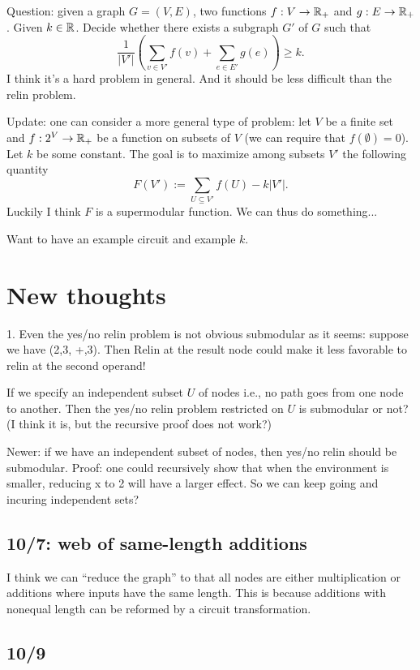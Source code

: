 \documentclass[11pt]{article} %
\theoremstyle{plain}
\theoremstyle{definition}
\begin{document}
Question: given a graph $G = (V,E)$, two functions $f: V \to \mathbb{R}_+$ and $g: E \to \mathbb{R}_+$. Given 
$k \in \mathbb{R}$. Decide whether there exists a subgraph $G'$ of $G$ such that 
\[
	\frac{1}{|V'|} (\sum_{v \in V'} f(v) + \sum_{e \in E'} g(e) )  \geq k. 
\]
I think it's a hard problem in general. And it should be less difficult than the relin problem. 

Update: one can consider a more general type of problem: let $V$ be a finite set and $f: 2^V \to \mathbb{R}_+$
be a function on subsets of $V$ (we can require that $f(\emptyset) = 0$). Let $k$ be some constant. 
The goal is to maximize among subsets $V'$ the following quantity
\[
	F(V') :=	\sum_{U \subseteq V'} f(U) - k|V'|. 
\]
Luckily I think $F$ is  a supermodular function. We can thus do something...

Want to have an example circuit and example $k$. 



\section{New thoughts}

1. Even the yes/no relin problem is not obvious submodular as it seems: suppose we have (2,3, +,3). 
Then Relin at the result node could make it less favorable to relin at the second operand! 

If we specify an independent subset $U$ of nodes i.e., no path goes from one node to another. Then the yes/no relin problem restricted on $U$ is submodular or not? (I think it is, but the recursive proof does not work?) 


Newer: if we have an independent subset of nodes, then yes/no relin should be submodular. Proof: one could recursively show that when the environment is smaller, reducing x to 2 will have a larger effect. 
So we can keep going and incuring independent sets? 

\subsection{10/7: web of same-length additions}

I think we can ``reduce the graph'' to that all nodes are either multiplication or additions where inputs have the same length. This is because additions with nonequal length can be reformed by a circuit transformation. 

\subsection{10/9}
\end{document}
